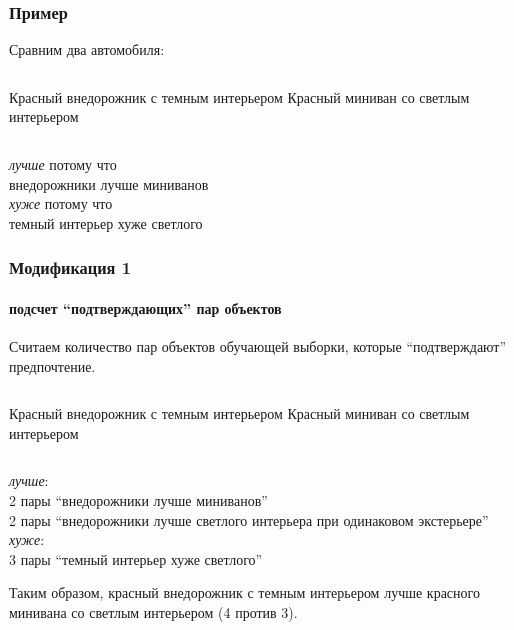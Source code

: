 \documentclass[xcolor=table]{beamer}
\theoremstyle{definition}
\begin{document}
	\begin{frame}
		\frametitle{Пример}
		\begin{center}
			Сравним два автомобиля:
		\end{center}
		\begin{columns}[c] 
			Красный внедорожник с темным интерьером
	    	Красный миниван со светлым интерьером
		\end{columns}
		\begin{center}
			\vspace{2em}
			\emph{лучше} потому что \\внедорожники лучше миниванов \\
			\vspace{2em}
			\emph{хуже} потому что \\темный интерьер хуже светлого 
		\end{center}
	\end{frame}
	
	\begin{frame}
		\frametitle{Модификация 1}
		\framesubtitle{подсчет ``подтверждающих'' пар объектов}
		Считаем количество пар объектов обучающей выборки, которые ``подтверждают'' предпочтение. 
		\vspace{1.4em}
		\begin{columns}[c] 
			\column{.5\textwidth} 
			Красный внедорожник с темным интерьером
			\column{.5\textwidth}
			Красный миниван со светлым интерьером
		\end{columns}
		\begin{center}
			\vspace{0.5em}
			\emph{лучше}: \\ 
			2 пары ``внедорожники лучше миниванов'' \\
			2 пары ``внедорожники лучше светлого интерьера при одинаковом экстерьере'' \\
			\vspace{1em}
			\emph{хуже}: \\
			3 пары ``темный интерьер хуже светлого''
		\end{center}
		
		\vspace{1.5em}
		Таким образом, красный внедорожник с темным интерьером {\color{green} лучше} красного минивана со светлым интерьером (4 против 3).
	\end{frame}
	
\end{document}
